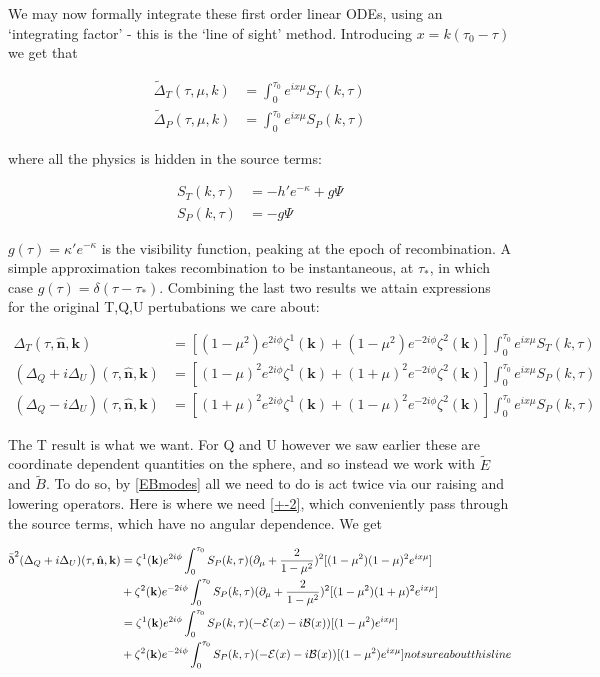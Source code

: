 \documentclass[a4paper,11pt]{article}
\renewcommand{\v}[1]{\mathbf{#1}}
\newcommand{\unit}[1]{\hat{\v{#1}}}
\renewcommand{\sl}{\bar{\text{\normalfont\dh}}}
\begin{document}
We may now formally integrate these first order linear ODEs, using an `integrating factor' - this is the `line of sight' method. Introducing $x=k(\tau_0-\tau)$ we get that 

\begin{align}
\tilde{\Delta}_T(\tau,\mu,k) &= \int_0^{\tau_0} e^{ix\mu}S_T(k,\tau)\\
\tilde{\Delta}_P(\tau,\mu,k) &= \int_0^{\tau_0} e^{ix\mu}S_P(k,\tau)
\end{align}

where all the physics is hidden in the source terms:

\begin{align}
S_T(k,\tau) &= -h'e^{-\kappa}+g\Psi\\
S_P(k,\tau) &= -g\Psi
\end{align}

$g(\tau) = \kappa'e^{-\kappa}$ is the visibility function, peaking at the epoch of recombination. A simple approximation takes recombination to be instantaneous, at $\tau_*$, in which case $g(\tau) = \delta(\tau-\tau_*)$. Combining the last two results we attain expressions for the original T,Q,U pertubations we care about:



\begin{align}
\Delta_T(\tau,\unit{n},\v{k}) &= [(1-\mu^2) e^{2i\phi} \zeta^1(\v{k})+(1-\mu^2) e^{-2i\phi} \zeta^2(\v{k})]\int_0^{\tau_0} e^{ix\mu}S_T(k,\tau)\\
(\Delta_Q+i\Delta_U)(\tau,\unit{n},\v{k}) &=[(1-\mu)^2 e^{2i\phi} \zeta^1(\v{k})+(1+\mu)^2 e^{-2i\phi} \zeta^2(\v{k})]\int_0^{\tau_0} e^{ix\mu}S_P(k,\tau)\\
(\Delta_Q-i\Delta_U)(\tau,\unit{n},\v{k}) &=[(1+\mu)^2 e^{2i\phi} \zeta^1(\v{k})+(1-\mu)^2 e^{-2i\phi} \zeta^2(\v{k})]\int_0^{\tau_0} e^{ix\mu}S_P(k,\tau)
\end{align}



The T result is what we want. For Q and U however we saw earlier these are coordinate dependent quantities on the sphere, and so instead we work with $\tilde{E}$ and $\tilde{B}$. To do so, by \ref{EBmodes} all we need to do is act twice via our raising and lowering operators. Here is where we need \ref{+-2}, which conveniently pass through the source terms, which have no angular dependence. We get

\begin{align}
\sl^2(\Delta_Q+i\Delta_U)(\tau,\unit{n},\v{k}) &= \zeta^1(\v{k})e^{2i\phi}\int_0^{\tau_0}S_P(k,\tau)(\partial_\mu+\frac{2}{1-\mu^2})^2[(1-\mu^2)(1-\mu)^2 e^{ix\mu}]\\
&{} + \zeta^2(\v{k})e^{-2i\phi}\int_0^{\tau_0}S_P(k,\tau)(\partial_\mu+\frac{2}{1-\mu^2})^2[(1-\mu^2)(1+\mu)^2 e^{ix\mu}]\\
&= \zeta^1(\v{k})e^{2i\phi}\int_0^{\tau_0}S_P(k,\tau)(-\mathcal{E}(x)-i\mathcal{B}(x))[(1-\mu^2) e^{ix\mu}] \\
&{} + \zeta^2(\v{k})e^{-2i\phi}\int_0^{\tau_0}S_P(k,\tau)(-\mathcal{E}(x)-i\mathcal{B}(x))[(1-\mu^2) e^{ix\mu}] not sure about this line
\end{align}
\end{document}

